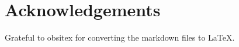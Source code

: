 \chapter*{Acknowledgements}
\setlength{\parskip}{1em}

Grateful to obsitex for converting the markdown files to LaTeX.

\setlength{\parskip}{0em}